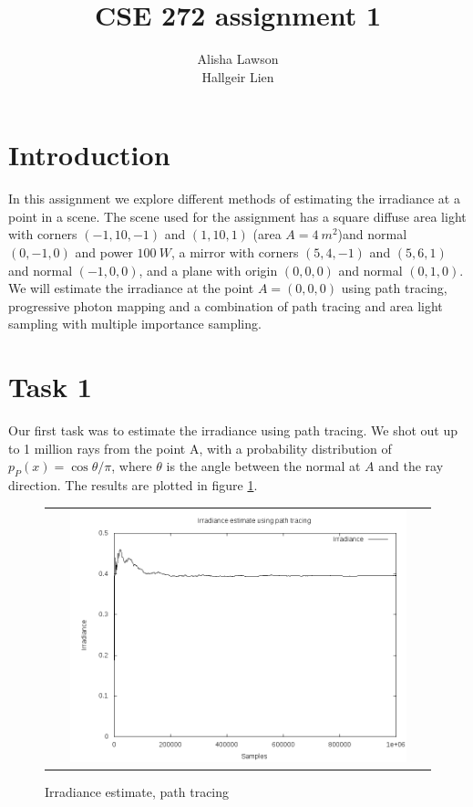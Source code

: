 \documentclass{article} %
\title{CSE 272 assignment 1}
\author{Alisha Lawson\\Hallgeir Lien}
\date{}
\begin{document}
\maketitle
\newpage

\section*{Introduction}
In this assignment we explore different methods of estimating the irradiance at a point in a scene. The scene used for the assignment has a square diffuse area light with corners $(-1,10,-1)$ and $(1,10,1)$ (area $A=4\ m^2$)and normal $(0,-1,0)$ and power $100\ W$, a mirror with corners $(5,4,-1)$ and $(5,6,1)$ and normal $(-1,0,0)$, and a plane with origin $(0,0,0)$ and normal $(0,1,0)$. We will estimate the irradiance at the point $A=(0,0,0)$ using path tracing, progressive photon mapping and a combination of path tracing and area light sampling with multiple importance sampling.

\section*{Task 1}
Our first task was to estimate the irradiance using path tracing. We shot out up to 1 million rays from the point A, with a probability distribution of $p_P(x) = \cos \theta / \pi$, where $\theta$ is the angle between the normal at $A$ and the ray direction. The results are plotted in figure \ref{fig:pathtracing}. 
\begin{figure}[h]
\begin{tabular}{c}
\includegraphics[width=0.9\textwidth]{plots/irrad_pathtracing.png}\\
\end{tabular}
\caption{Irradiance estimate, path tracing}
\label{fig:pathtracing}
\end{figure}
\end{document}
